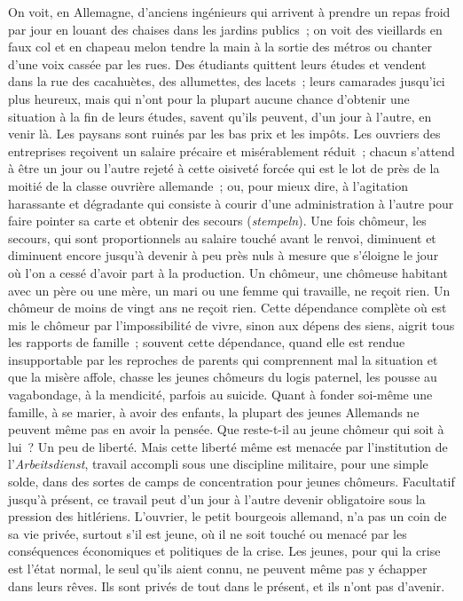 \documentclass[french,twoside]{book} %
\begin{document}
On voit, en Allemagne, d'anciens ingénieurs qui arrivent à prendre un repas froid par jour en louant des chaises dans les jardins publics ; on voit des vieillards en faux col et en chapeau melon tendre la main à la sortie des métros ou chanter d'une voix cassée par les rues. Des étudiants quittent leurs études et vendent dans la rue des cacahuètes, des allumettes, des lacets ; leurs camarades jusqu'ici plus heureux, mais qui n'ont pour la plupart aucune chance d'obtenir une situation à la fin de leurs études, savent qu'ils peuvent, d'un jour à l'autre, en venir là. Les paysans sont ruinés par les bas prix et les impôts. Les ouvriers des entreprises reçoivent un salaire précaire et miséra­blement réduit ; chacun s'attend à être un jour ou l'autre rejeté à cette oisiveté forcée qui est le lot de près de la moitié de la classe ouvrière allemande ; ou, pour mieux dire, à l'agitation harassante et dégradante qui consiste à courir d'une administration à l'autre pour faire pointer sa carte et obtenir des secours ({\itshape stempeln}). Une fois chômeur, les secours, qui sont proportionnels au salaire touché avant le renvoi, diminuent et diminuent encore jusqu'à devenir à peu près nuls à mesure que s'éloigne le jour où l'on a cessé d'avoir part à la production. Un chômeur, une chômeuse habitant avec un père ou une mère, un mari ou une femme qui travaille, ne reçoit rien. Un chômeur de moins de vingt ans ne reçoit rien. Cette dépendance complète où est mis le chômeur par l'impossibilité de vivre, sinon aux dépens des siens, aigrit tous les rapports de famille ; souvent cette dépendance, quand elle est rendue insupportable par les reproches de parents qui comprennent mal la situation et que la misère affole, chasse les jeunes chômeurs du logis paternel, les pousse au vagabondage, à la mendicité, parfois au suicide. Quant à fonder soi-même une famille, à se marier, à avoir des enfants, la plupart des jeunes Allemands ne peuvent même pas en avoir la pensée. Que reste-t-il au jeune chômeur qui soit à lui ? Un peu de liberté. Mais cette liberté même est menacée par l'institution de l'{\itshape Arbeitsdienst}, travail accompli sous une discipline militaire, pour une simple solde, dans des sortes de camps de concentration pour jeunes chômeurs. Facultatif jusqu'à présent, ce travail peut d'un jour à l'autre devenir obligatoire sous la pression des hitlériens. L'ouvrier, le petit bourgeois allemand, n'a pas un coin de sa vie privée, surtout s'il est jeune, où il ne soit touché ou menacé par les conséquences économiques et politiques de la crise. Les jeunes, pour qui la crise est l'état normal, le seul qu'ils aient connu, ne peuvent même pas y échapper dans leurs rêves. Ils sont privés de tout dans le présent, et ils n'ont pas d'avenir.\par
\end{document}
